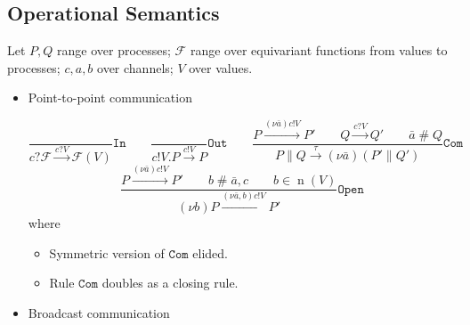 \documentclass{article}
\newcommand{\pOut}{{!}}
\newcommand{\pIn}{{?}}
\newcommand{\new}[2]{(\nu\!#1) #2}
\newcommand{\freshFor}{\mathrel{\#}}
\DeclareMathOperator{\n}{n}
\begin{document}
\subsection{Operational Semantics}

Let $P, Q$ range over processes; $\mathcal{F}$ range over equivariant functions
from values to processes; $c, a, b$ over channels; $V$ over values.

\begin{itemize}

\item Point-to-point communication

\begin{equation*}
%
%
\frac{
}{
c \pIn \mathcal{F} \xrightarrow{c \pIn V} \mathcal{F}(V)
}
\mathtt{In}
%
\qquad
%
%
\frac{
}{
c \pOut V. P \xrightarrow{c \pOut V} P
}
\mathtt{Out}
%
\qquad
%
\frac{
P \xrightarrow{\new{\bar{a}}{c \pOut V}} P' \qquad
Q \xrightarrow{c \pIn V} Q' \qquad
\bar{a} \freshFor Q
}{
P \parallel Q \xrightarrow{\tau} \new{\bar{a}}{(P' \parallel Q')}
}
\mathtt{Com}
%
\end{equation*}
%
\begin{equation*}
\frac{
P \xrightarrow{\new{\bar{a}}{c \pOut V}} P' \qquad
b \freshFor \bar{a}, c \qquad
b \in \n(V)
}{
\new{b}{P} \xrightarrow{\new{\bar{a},b}{c \pOut V}} P'
}
\mathtt{Open}
\end{equation*}
%
where
%
\begin{itemize}
\item Symmetric version of $\mathtt{Com}$ elided.
\item Rule $\mathtt{Com}$ doubles as a closing rule.
\end{itemize}


\item Broadcast communication


\end{itemize}
\end{document}
